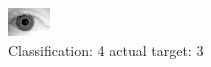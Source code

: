 \begin{figure}[h!]
\begin{center}
\includegraphics[width=0.60\columnwidth]{figures/ID2094_class_4_target_3.png}
\end{center}
\caption{ Classification: 4 actual target: 3}
\label{fig:ID2094_class_4_target_3}
\end{figure}
